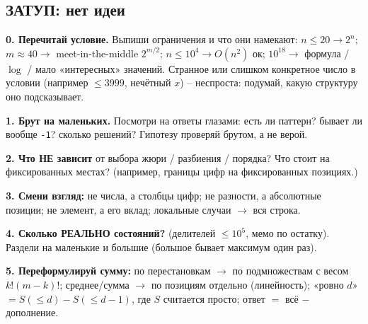 \subsection{ЗАТУП: нет идеи}
\textbf{0. Перечитай условие.} Выпиши ограничения и что они намекают: $n\le20\to2^n$; $m\approx40\to$ meet-in-the-middle $2^{m/2}$; $n\le10^4\to O(n^2)$ ок; $10^{18}\to$ формула / $\log$ / мало «интересных» значений. Странное или слишком конкретное число в условии (например $\le3999$, нечётный $x$) -- неспроста: подумай, какую структуру оно подсказывает.
\par \textbf{1. Брут на маленьких.} Посмотри на ответы глазами: есть ли паттерн? бывает ли вообще \texttt{-1}? сколько решений? Гипотезу проверяй брутом, а не верой.
\par {}
\par \textbf{2. Что НЕ зависит} от выбора жюри / разбиения / порядка? Что стоит на фиксированных местах? (например, границы цифр на фиксированных позициях.)
\par \textbf{3. Смени взгляд:} не числа, а столбцы цифр; не разности, а абсолютные позиции; не элемент, а его вклад; локальные случаи $\to$ вся строка.
\par \textbf{4. Сколько РЕАЛЬНО состояний?} (делителей $\le10^5$, мемо по остатку). Раздели на маленькие и большие (большое бывает максимум один раз).
\par \textbf{5. Переформулируй сумму:} по перестановкам $\to$ по подмножествам с весом $k!(m-k)!$; среднее/сумма $\to$ по позициям отдельно (линейность); «ровно $d$» $=S(\le d)-S(\le d-1)$, где $S$ считается просто; ответ $=$ всё $-$ дополнение.
